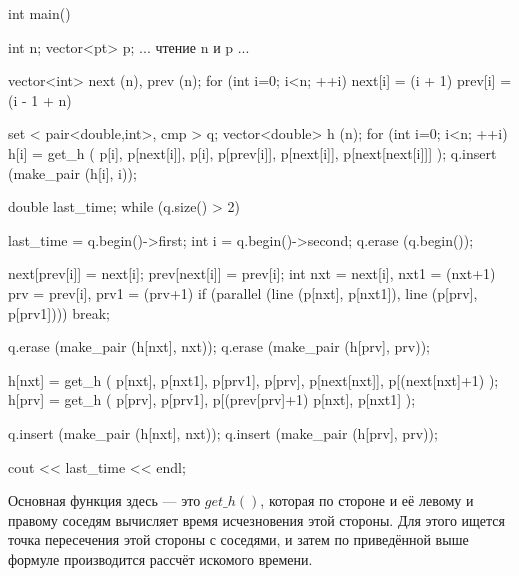 int main() {
	int n;
	vector<pt> p;
	... чтение n и p ...

	vector<int> next (n), prev (n);
	for (int i=0; i<n; ++i) {
		next[i] = (i + 1) %
		prev[i] = (i - 1 + n) %
	}

	set < pair<double,int>, cmp > q;
	vector<double> h (n);
	for (int i=0; i<n; ++i) {
		h[i] = get_h (
			p[i], p[next[i]],
			p[i], p[prev[i]],
			p[next[i]], p[next[next[i]]]
		);
		q.insert (make_pair (h[i], i));
	}

	double last_time;
	while (q.size() > 2) {
		last_time = q.begin()->first;
		int i = q.begin()->second;
		q.erase (q.begin());

		next[prev[i]] = next[i];
		prev[next[i]] = prev[i];
		int nxt = next[i],   nxt1 = (nxt+1)%
			prv = prev[i],   prv1 = (prv+1)%
		if (parallel (line (p[nxt], p[nxt1]), line (p[prv], p[prv1])))
			break;

		q.erase (make_pair (h[nxt], nxt));
		q.erase (make_pair (h[prv], prv));

		h[nxt] = get_h (
			p[nxt], p[nxt1],
			p[prv1], p[prv],
			p[next[nxt]], p[(next[nxt]+1)%
		);
		h[prv] = get_h (
			p[prv], p[prv1],
			p[(prev[prv]+1)%
			p[nxt], p[nxt1]
		);

		q.insert (make_pair (h[nxt], nxt));
		q.insert (make_pair (h[prv], prv));
	}

	cout << last_time << endl;
}
\endcode

Основная функция здесь --- это $get\_h()$, которая по стороне и её левому и правому соседям вычисляет время исчезновения этой стороны. Для этого ищется точка пересечения этой стороны с соседями, и затем по приведённой выше формуле производится рассчёт искомого времени.
